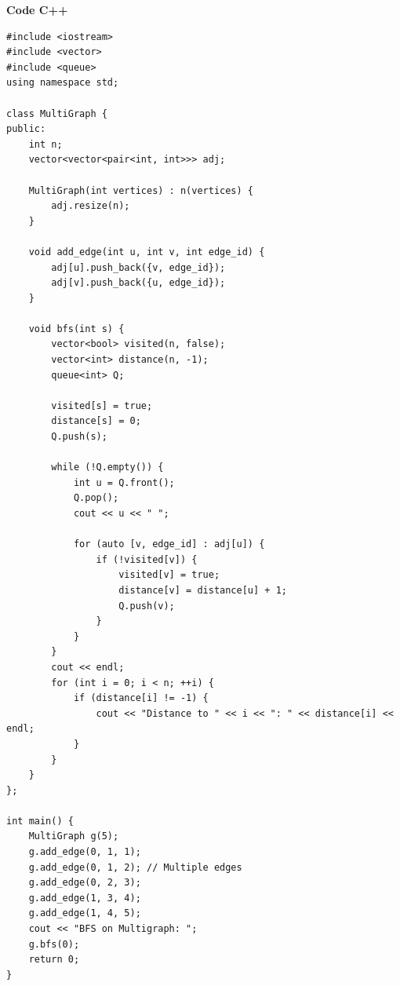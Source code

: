 \documentclass[a4paper,12pt]{article}
\begin{document}
\textbf{Code C++}
\lstset{language=C++}
\begin{lstlisting}
#include <iostream>
#include <vector>
#include <queue>
using namespace std;

class MultiGraph {
public:
    int n;
    vector<vector<pair<int, int>>> adj;

    MultiGraph(int vertices) : n(vertices) {
        adj.resize(n);
    }

    void add_edge(int u, int v, int edge_id) {
        adj[u].push_back({v, edge_id});
        adj[v].push_back({u, edge_id});
    }

    void bfs(int s) {
        vector<bool> visited(n, false);
        vector<int> distance(n, -1);
        queue<int> Q;

        visited[s] = true;
        distance[s] = 0;
        Q.push(s);

        while (!Q.empty()) {
            int u = Q.front();
            Q.pop();
            cout << u << " ";

            for (auto [v, edge_id] : adj[u]) {
                if (!visited[v]) {
                    visited[v] = true;
                    distance[v] = distance[u] + 1;
                    Q.push(v);
                }
            }
        }
        cout << endl;
        for (int i = 0; i < n; ++i) {
            if (distance[i] != -1) {
                cout << "Distance to " << i << ": " << distance[i] << endl;
            }
        }
    }
};

int main() {
    MultiGraph g(5);
    g.add_edge(0, 1, 1);
    g.add_edge(0, 1, 2); // Multiple edges
    g.add_edge(0, 2, 3);
    g.add_edge(1, 3, 4);
    g.add_edge(1, 4, 5);
    cout << "BFS on Multigraph: ";
    g.bfs(0);
    return 0;
}
\end{lstlisting}
\end{document}
